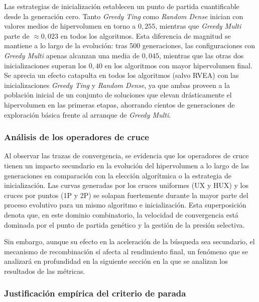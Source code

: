 Las estrategias de inicialización establecen un punto de partida cuantificable desde la generación cero. Tanto \textit{Greedy Ting} como \textit{Random Dense} inician con valores medios de hipervolumen en torno a $0{,}255$, mientras que \textit{Greedy Multi} parte de $\approx 0{,}023$ en todos los algoritmos. Esta diferencia de magnitud se mantiene a lo largo de la evolución: tras 500 generaciones, las configuraciones con \textit{Greedy Multi} apenas alcanzan una media de $0{,}045$, mientras que las otras dos inicializaciones superan los $0{,}40$ en los algoritmos con mayor hipervolumen final. Se aprecia un efecto catapulta en todos los algoritmos (salvo RVEA) con las inicializaciones \textit{Greedy Ting} y \textit{Random Dense}, ya que ambas proveen a la población inicial de un conjunto de soluciones que elevan drásticamente el hipervolumen en las primeras etapas, ahorrando cientos de generaciones de exploración básica frente al arranque de \textit{Greedy Multi}.

\subsubsection{Análisis de los operadores de cruce}

Al observar las trazas de convergencia, se evidencia que los operadores de cruce tienen un impacto secundario en la evolución del hipervolumen a lo largo de las generaciones en comparación con la elección algorítmica o la estrategia de inicialización. Las curvas generadas por los cruces uniformes (UX y HUX) y los cruces por puntos (1P y 2P) se solapan fuertemente durante la mayor parte del proceso evolutivo para un mismo algoritmo e inicialización. Esta superposición denota que, en este dominio combinatorio, la velocidad de convergencia está dominada por el punto de partida genético y la gestión de la presión selectiva. 

Sin embargo, aunque su efecto en la aceleración de la búsqueda sea secundario, el mecanismo de recombinación sí afecta al rendimiento final, un fenómeno que se analizará en profundidad en la siguiente sección en la que se analizan los resultados de las métricas.

\subsubsection{Justificación empírica del criterio de parada}


